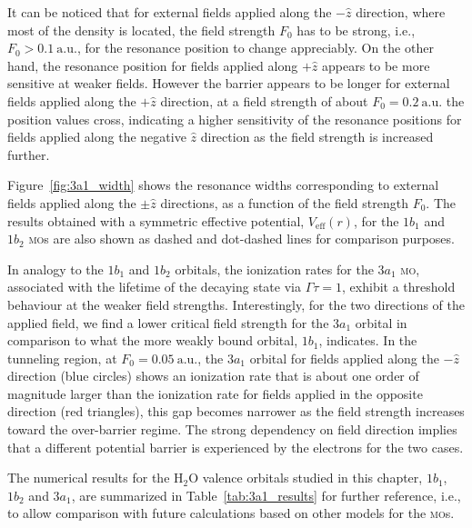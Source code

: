 It can be noticed that for external fields applied along the
$-\hat{z}$ direction, where most of the density is located, the field
strength $F_{0}$ has to be strong, i.e., $F_{0}>0.1\ \mathrm{a.u.}$,
for the resonance position to change appreciably. On the other hand,
the resonance position for fields applied along $+\hat{z}$ appears to
be more sensitive at weaker fields. However the barrier appears to be
longer for external fields applied along the $+\hat{z}$ direction, at
a field strength of about $F_{0} = 0.2\ \mathrm{a.u.}$ the position
values cross, indicating a higher sensitivity of the resonance
positions for fields applied along the negative $\hat{z}$ direction as
the field strength is increased further.

Figure~\ref{fig:3a1_width} shows the resonance widths corresponding to
external fields applied along the $\pm\hat{z}$ directions, as a
function of the field strength $F_{0}$. The results obtained with a
symmetric effective potential, $V_{\mathrm{eff}}(r)$, for the $1b_{1}$
and $1b_{2}$ \textsc{mo}s are also shown as dashed and dot-dashed
lines for comparison purposes.

In analogy to the $1b_{1}$ and $1b_{2}$ orbitals, the ionization rates
for the $3a_{1}$ \textsc{mo}, associated with the lifetime of the
decaying state via $\Gamma\tau=1$, exhibit a threshold behaviour at
the weaker field strengths. Interestingly, for the two directions of
the applied field, we find a lower critical field strength for the
$3a_{1}$ orbital in comparison to what the more weakly bound orbital,
$1b_{1}$, indicates. In the tunneling region, at $F_{0} =
0.05\ \mathrm{a.u.}$, the $3a_{1}$ orbital for fields applied along
the $-\hat{z}$ direction (blue circles) shows an ionization rate that
is about one order of magnitude larger than the ionization rate for
fields applied in the opposite direction (red triangles), this gap
becomes narrower as the field strength increases toward the
over-barrier regime. The strong dependency on field direction implies
that a different potential barrier is experienced by the electrons for
the two cases.

The numerical results for the H$_{2}$O valence orbitals studied in
this chapter, $1b_{1}$, $1b_{2}$ and $3a_{1}$, are summarized in
Table~\ref{tab:3a1_results} for further reference, i.e., to allow
comparison with future calculations based on other models for the
\textsc{mo}s.

